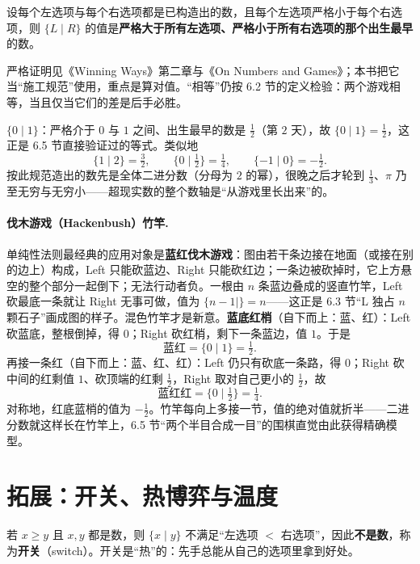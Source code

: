 \begin{theorem}[单纯性法则]\label{thm:simplicity}
设每个左选项与每个右选项都是已构造出的数，且每个左选项严格小于每个右选项，则 $\{L\mid R\}$ 的值是\textbf{严格大于所有左选项、严格小于所有右选项的那个出生最早}的数。
\end{theorem}

严格证明见《Winning Ways》第二章与《On Numbers and Games》；本书把它当“施工规范”使用，重点是算对值。“相等”仍按 6.2 节的定义检验：两个游戏相等，当且仅当它们的差是后手必胜。

\begin{example}[二进分数的诞生]\label{ex:dyadic}
$\{0\mid 1\}$：严格介于 $0$ 与 $1$ 之间、出生最早的数是 $\tfrac12$（第 $2$ 天），故 $\{0\mid 1\}=\tfrac12$，这正是 6.5 节直接验证过的等式。类似地
\[
 \{1\mid 2\}=\tfrac32,\qquad \{0\mid \tfrac12\}=\tfrac14,\qquad \{-1\mid 0\}=-\tfrac12 .
\]
按此规范造出的数先是全体二进分数（分母为 $2$ 的幂），很晚之后才轮到 $\tfrac13$、$\pi$ 乃至无穷与无穷小——超现实数的整个数轴是“从游戏里长出来”的。
\end{example}

\paragraph{伐木游戏（Hackenbush）竹竿.} 单纯性法则最经典的应用对象是\textbf{蓝红伐木游戏}：图由若干条边接在地面（或接在别的边上）构成，Left 只能砍蓝边、Right 只能砍红边；一条边被砍掉时，它上方悬空的整个部分一起倒下；无法行动者负。一根由 $n$ 条蓝边叠成的竖直竹竿，Left 砍最底一条就让 Right 无事可做，值为 $\{n-1\mid\}=n$——这正是 6.3 节“L 独占 $n$ 颗石子”画成图的样子。混色竹竿才是新意。\textbf{蓝底红梢}（自下而上：蓝、红）：Left 砍蓝底，整根倒掉，得 $0$；Right 砍红梢，剩下一条蓝边，值 $1$。于是
\[
 \text{蓝红}=\{0\mid 1\}=\tfrac12 .
\]
再接一条红（自下而上：蓝、红、红）：Left 仍只有砍底一条路，得 $0$；Right 砍中间的红剩值 $1$、砍顶端的红剩 $\tfrac12$，Right 取对自己更小的 $\tfrac12$，故
\[
 \text{蓝红红}=\{0\mid \tfrac12\}=\tfrac14 .
\]
对称地，红底蓝梢的值为 $-\tfrac12$。竹竿每向上多接一节，值的绝对值就折半——二进分数就这样长在竹竿上，6.5 节“两个半目合成一目”的围棋直觉由此获得精确模型。

\section{拓展：开关、热博弈与温度}
若 $x\ge y$ 且 $x,y$ 都是数，则 $\{x\mid y\}$ 不满足“左选项 $<$ 右选项”，因此\textbf{不是数}，称为\textbf{开关}（switch）。开关是“热”的：先手总能从自己的选项里拿到好处。


